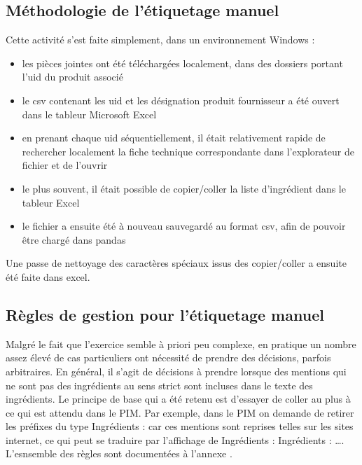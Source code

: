             \subsection{Méthodologie de l'étiquetage manuel}

            Cette activité s'est faite simplement, dans un environnement Windows : 
            \begin{itemize}
                \item les pièces jointes ont été téléchargées localement, dans des dossiers portant l'uid du produit associé
                \item le csv contenant les uid et les désignation produit fournisseur a été ouvert dans le tableur Microsoft Excel
                \item en prenant chaque uid séquentiellement, il était relativement rapide de rechercher localement la fiche technique correspondante dans l'explorateur de fichier et de l'ouvrir
                \item le plus souvent, il était possible de copier/coller la liste d'ingrédient dans le tableur Excel
                \item le fichier a ensuite été à nouveau sauvegardé au format csv, afin de pouvoir être chargé dans pandas
            \end{itemize}
            Une passe de nettoyage des caractères spéciaux issus des copier/coller a ensuite été faite dans excel.

            \subsection{Règles de gestion pour l'étiquetage manuel}
        
            Malgré le fait que l'exercice semble à priori peu complexe, en pratique un nombre assez élevé de cas particuliers ont nécessité de prendre des décisions, parfois arbitraires.
            En général, il s'agit de décisions à prendre lorsque des mentions qui ne sont pas des ingrédients au sens strict sont incluses dans le texte des ingrédients.
            Le principe de base qui a été retenu est d'essayer de coller au plus à ce qui est attendu dans le PIM. 
            Par exemple, dans le PIM on demande de retirer les préfixes du type \og Ingrédients : \fg car ces mentions sont reprises telles sur les sites internet, ce qui peut se traduire par l'affichage de \og Ingrédients : Ingrédients : \dots \fg.
            L'esnsemble des règles sont documentées à l'annexe .

